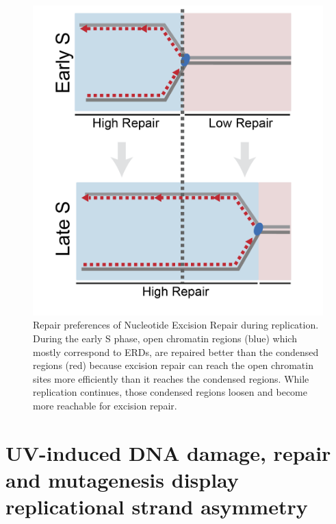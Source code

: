 \begin{figure}[H]
    \begin{center}
    \includegraphics[width=\textwidth]{Chapters/5_discussion/figures/model}
    \caption[Repair preferences of Nucleotide Excision Repair during replication.]{Repair preferences of Nucleotide Excision Repair during replication. During the early S phase, open chromatin regions (blue) which mostly correspond to ERDs, are repaired better than the condensed regions (red) because excision repair can reach the open chromatin sites more efficiently than it reaches the condensed regions. While replication continues, those condensed regions loosen and become more reachable for excision repair.}
    \label{fig:model}
    \end{center}
    \end{figure}

\section{UV-induced DNA damage, repair and mutagenesis display replicational strand asymmetry}


